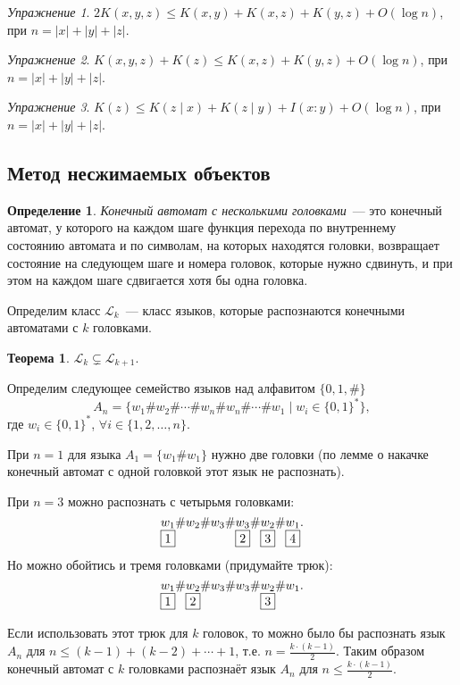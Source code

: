 \documentclass[12pt]{article}
\newcommand{\bits}{\{0,1\}}
\newcommand{\bitstr}{\bits^*}
\theoremstyle{definition}
\newtheorem{definition}{Определение}[section]
\theoremstyle{plain}
\newtheorem{theorem}{Теорема}[section]
\theoremstyle{remark}
\newtheorem{exercise}{Упражнение}[section]
\begin{document}
\begin{exercise}
    $2K(x,y,z)\le K(x,y) + K(x,z) + K(y,z) + O(\log n)$, при $n = |x|+|y|+|z|$.
\end{exercise}
\begin{exercise}
    $K(x,y,z) + K(z)\le K(x,z) + K(y,z) + O(\log n)$, при $n = |x|+|y|+|z|$.
\end{exercise}
\begin{exercise}
    $K(z)\le K(z\mid x) + K(z\mid y) + I(x:y) + O(\log n)$, при $n = |x|+|y|+|z|$.
\end{exercise}

\subsection{Метод несжимаемых объектов}
\begin{definition}
    \emph{Конечный автомат с несколькими головками}~--- это конечный автомат, у
    которого на каждом шаге функция перехода по внутреннему состоянию автомата
    и по символам, на которых находятся головки, возвращает состояние на
    следующем шаге и номера головок, которые нужно сдвинуть, и при этом на каждом 
    шаге сдвигается хотя бы одна головка.
\end{definition}
    Определим класс $\mathcal L_k$~--- класс языков, которые распознаются
    конечными автоматами с $k$ головками.
\begin{theorem}\label{thm:kDFA}
    $\mathcal L_k \subsetneq \mathcal L_{k+1}.$
\end{theorem}

Определим следующее семейство языков над алфавитом $\{0,1,\#\}$
\[
A_n = \{w_1\#w_2\#\dotsb\#w_n\#w_n\#\dotsb\#w_1\mid w_i\in\bitstr\},
\]
где $w_i\in\bitstr$, $\forall i\in\{1,2,\dotsc,n\}$.

При $n = 1$ для языка $A_1 = \{w_1\#w_1\}$ нужно две головки (по лемме о накачке 
конечный автомат с одной головкой этот язык не распознать).

При $n = 3$ можно распознать с четырьмя головками:
\[
\underset{\fbox{1}}{w_1}\#w_2\#w_3\#\underset{\fbox{2}}{w_3}\#\underset{\fbox{3}}{w_2}\#\underset{\fbox{4}}{w_1}.
\]
Но можно обойтись и тремя головками (придумайте трюк):
\[
\underset{\fbox{1}}{w_1}\#\underset{\fbox{2}}{w_2}\#w_3\#w_3\#\underset{\fbox{3}}{w_2}\#w_1.
\]

Если использовать этот трюк для $k$ головок, то можно было бы распознать
язык $A_n$ для $n \le (k-1) + (k-2) + \dotsb + 1$, т.е. $n =
\frac{k\cdot(k-1)}{2}$. Таким образом конечный автомат с $k$ головками 
распознаёт язык $A_n$ для $n \le \frac{k\cdot(k-1)}{2}$.
\end{document}
